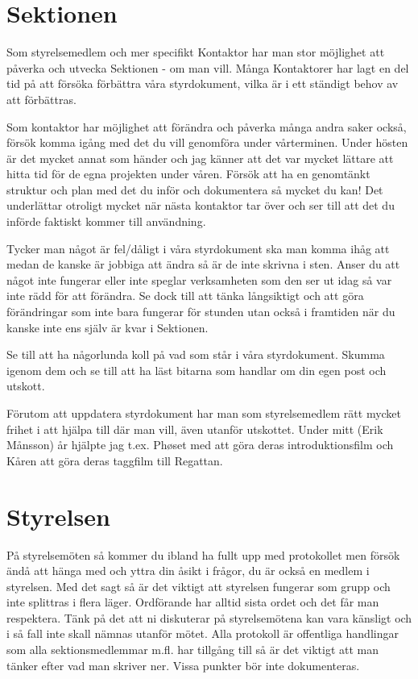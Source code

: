 \documentclass[10pt]{article}
\begin{document}
\tableofcontents
\newpage

\section{Sektionen}
Som styrelsemedlem och mer specifikt Kontaktor har man stor möjlighet att påverka och utvecka Sektionen - om man vill. Många Kontaktorer har lagt en del tid på att försöka förbättra våra styrdokument, vilka är i ett ständigt behov av att förbättras.

Som kontaktor har möjlighet att förändra och påverka många andra saker också, försök komma igång med det du vill genomföra under vårterminen. Under hösten är det mycket annat som händer och jag känner att det var mycket lättare att hitta tid för de egna projekten under våren. Försök att ha en genomtänkt struktur och plan med det du inför och dokumentera så mycket du kan! Det underlättar otroligt mycket när nästa kontaktor tar över och ser till att det du införde faktiskt kommer till användning.   

Tycker man något är fel/dåligt i våra styrdokument ska man komma ihåg att medan de kanske är jobbiga att ändra så är de inte skrivna i sten. Anser du att något inte fungerar eller inte speglar verksamheten som den ser ut idag så var inte rädd för att förändra. Se dock till att tänka långsiktigt och att göra förändringar som inte bara fungerar för stunden utan också i framtiden när du kanske inte ens själv är kvar i Sektionen.

Se till att ha någorlunda koll på vad som står i våra styrdokument. Skumma igenom dem och se till att ha läst bitarna som handlar om din egen post och utskott.

Förutom att uppdatera styrdokument har man som styrelsemedlem rätt mycket frihet i att hjälpa till där man vill, även utanför utskottet. Under mitt (Erik Månsson) år hjälpte jag t.ex. Ph\o set med att göra deras introduktionsfilm och Kåren att göra deras taggfilm till Regattan.

\section{Styrelsen}
På styrelsemöten så kommer du ibland ha fullt upp med protokollet men försök ändå att hänga med och yttra din åsikt i frågor, du är också en medlem i styrelsen. Med det sagt så är det viktigt att styrelsen fungerar som grupp och inte splittras i flera läger. Ordförande har alltid sista ordet och det får man respektera. Tänk på det att ni diskuterar på styrelsemötena kan vara känsligt och i så fall inte skall nämnas utanför mötet. Alla protokoll är offentliga handlingar som alla sektionsmedlemmar m.fl. har tillgång till så är det viktigt att man tänker efter vad man skriver ner. Vissa punkter bör inte dokumenteras.
\end{document}
